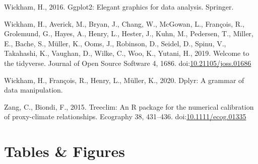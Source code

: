 \documentclass[review]{elsarticle} %
\begin{document}
\leavevmode\hypertarget{ref-wickham2016ggplot2}{}%
Wickham, H., 2016. Ggplot2: Elegant graphics for data analysis. Springer.

\leavevmode\hypertarget{ref-Wickham2019}{}%
Wickham, H., Averick, M., Bryan, J., Chang, W., McGowan, L., François, R., Grolemund, G., Hayes, A., Henry, L., Hester, J., Kuhn, M., Pedersen, T., Miller, E., Bache, S., Müller, K., Ooms, J., Robinson, D., Seidel, D., Spinu, V., Takahashi, K., Vaughan, D., Wilke, C., Woo, K., Yutani, H., 2019. Welcome to the tidyverse. Journal of Open Source Software 4, 1686. doi:\href{https://doi.org/10.21105/joss.01686}{10.21105/joss.01686}

\leavevmode\hypertarget{ref-Wickham2020dplyr}{}%
Wickham, H., François, R., Henry, L., Müller, K., 2020. Dplyr: A grammar of data manipulation.

\leavevmode\hypertarget{ref-Zang2015}{}%
Zang, C., Biondi, F., 2015. Treeclim: An R package for the numerical calibration of proxy-climate relationships. Ecography 38, 431--436. doi:\href{https://doi.org/10.1111/ecog.01335}{10.1111/ecog.01335}

\newpage

\hypertarget{tables-figures}{%
\section*{Tables \& Figures}\label{tables-figures}}
\end{document}
